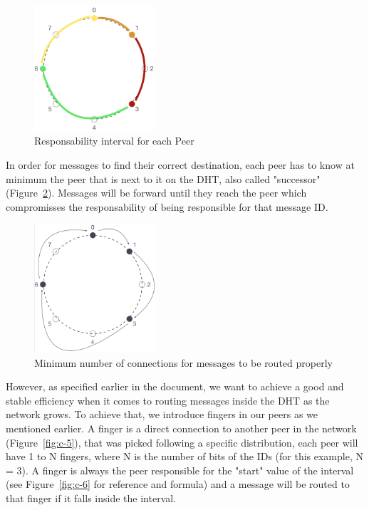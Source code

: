 \begin{figure}[h!]
  \centering
  \includegraphics[width=0.4\textwidth]{figs/chord-3}
  \caption{Responsability interval for each Peer}
  \label{fig:c-3}
\end{figure}

In order for messages to find their correct destination, each peer has to know at minimum the peer that is next to it on the DHT, also called "successor" (Figure~\ref{fig:c-4}). Messages will be forward until they reach the peer which compromisses the responsability of being responsible for that message ID.

\begin{figure}[h!]
  \centering
  \includegraphics[width=0.4\textwidth]{figs/chord-4}
  \caption{Minimum number of connections for messages to be routed properly}
  \label{fig:c-4}
\end{figure}

However, as specified earlier in the document, we want to achieve a good and stable efficiency when it comes to routing messages inside the DHT as the network grows. To achieve that, we introduce fingers in our peers as we mentioned earlier. A finger is a direct connection to another peer in the network (Figure~\ref{fig:c-5}), that was picked following a specific distribution, each peer will have 1 to N fingers, where N is the number of bits of the IDs (for this example, N = 3). A finger is always the peer responsible for the "start" value of the interval (see Figure~\ref{fig:c-6} for reference and formula) and a message will be routed to that finger if it falls inside the interval.

